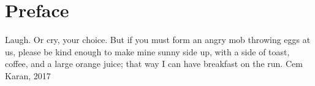 
\chapter*{Preface}

Laugh.  Or cry, your choice.  But if you must form an angry mob throwing eggs at
us, please be kind enough to make mine sunny side up, with a side of toast,
coffee, and a large orange juice; that way I can have breakfast on the run. \newline
\hspace*{\fill}Cem Karan, 2017
